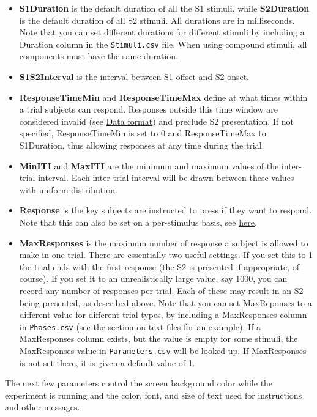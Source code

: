 \documentclass[11pt,]{article}
\begin{document}
\begin{itemize}
\item
  \textbf{S1Duration} is the default duration of all the S1 stimuli,
  while \textbf{S2Duration} is the default duration of all S2 stimuli.
  All durations are in milliseconds. Note that you can set different
  durations for different stimuli by including a Duration column in the
  \texttt{Stimuli.csv} file. When using compound stimuli, all components
  must have the same duration.
\item
  \textbf{S1S2Interval} is the interval between S1 offset and S2 onset.
\item
  \textbf{ResponseTimeMin} and \textbf{ResponseTimeMax} define at what
  times within a trial subjects can respond. Responses outside this time
  window are considered invalid (see \hyperref[data-format]{Data
  format}) and preclude S2 presentation. If not specified,
  ResponseTimeMin is set to 0 and ResponseTimeMax to S1Duration, thus
  allowing responses at any time during the trial.
\item
  \textbf{MinITI} and \textbf{MaxITI} are the minimum and maximum values
  of the inter-trial interval. Each inter-trial interval will be drawn
  between these values with uniform distribution.
\item
  \textbf{Response} is the key subjects are instructed to press if they
  want to respond. Note that this can also be set on a per-stimulus
  basis, see \hyperref[responses]{here}. \label{maxresponses}
\item
  \textbf{MaxResponses} is the maximum number of response a subject is
  allowed to make in one trial. There are essentially two useful
  settings. If you set this to 1 the trial ends with the first response
  (the S2 is presented if appropriate, of course). If you set it to an
  unrealistically large value, say 1000, you can record any number of
  responses per trial. Each of these may result in an S2 being
  presented, as described above. Note that you can set MaxReponses to a
  different value for different trial types, by including a MaxResponses
  column in \texttt{Phases.csv} (see the \hyperref[textfiles]{section on
  text files} for an example). If a MaxResponses column exists, but the
  value is empty for some stimuli, the MaxResponses value in
  \texttt{Parameters.csv} will be looked up. If MaxResponses is not set
  there, it is given a default value of 1.
\end{itemize}

The next few parameters control the screen background color while the
experiment is running and the color, font, and size of text used for
instructions and other messages.
\end{document}

